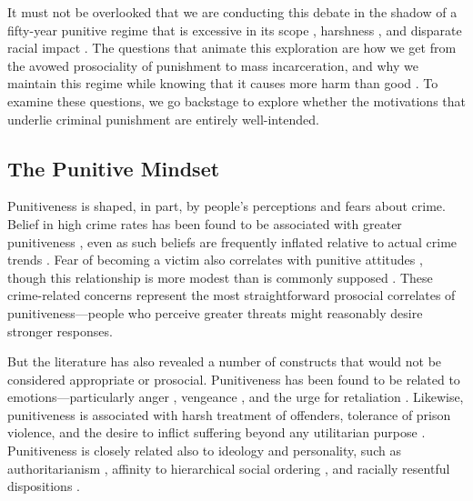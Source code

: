 It must not be overlooked that we are conducting this debate in the shadow of a fifty-year punitive regime that is excessive in its scope \citep{NRC2014, Garland2001}, harshness \citep{Gottschalk2016, JSimon2016}, and disparate racial impact \citep{Armour2020, Alexander2010, Western2006}. The questions that animate this exploration are how we get from the avowed prosociality of punishment to mass incarceration, and why we maintain this regime while knowing that it causes more harm than good \citep[see][]{NRC2014, Tonry2018}. To examine these questions, we go backstage to explore whether the motivations that underlie criminal punishment are entirely well-intended.

\subsection{The Punitive Mindset}

Punitiveness is shaped, in part, by people's perceptions and fears about crime. Belief in high crime rates has been found to be associated with greater punitiveness \citep{ApplegateEtAl2002, Hough2005, Pickett2019}, even as such beliefs are frequently inflated relative to actual crime trends \citep{Pfaff2017, QuillianPager2010}. Fear of becoming a victim also correlates with punitive attitudes \citep{Hough2005}, though this relationship is more modest than is commonly supposed \citep{Gerber2021, Pickett2019}. These crime-related concerns represent the most straightforward prosocial correlates of punitiveness---people who perceive greater threats might reasonably desire stronger responses.

But the literature has also revealed a number of constructs that would not be considered appropriate or prosocial. Punitiveness has been found to be related to emotions---particularly anger \citep{GaultSabini2000, MischkowskiGlocknerLewisch2018}, vengeance \citep{Dewall2007, Jackson2019}, and the urge for retaliation \citep{FergusonRule1983}. Likewise, punitiveness is associated with harsh treatment of offenders, tolerance of prison violence, and the desire to inflict suffering beyond any utilitarian purpose \citep{FincherTetlock2015, GillCerce2021b}. Punitiveness is closely related also to ideology and personality, such as authoritarianism \citep{Altemeyer1981, GerberJackson2013}, affinity to hierarchical social ordering \citep{Pratto1994, SidaniusPratto2001}, and racially resentful dispositions \citep{ChiricosWelchGertz2004, UnneverCullen2010b}.

